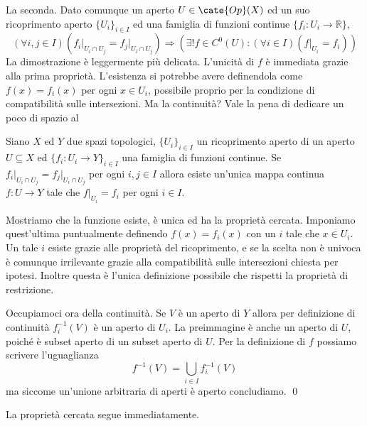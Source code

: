 La seconda.
Dato comunque un aperto $U\in\cate{Op}(X)$ ed un suo ricoprimento aperto $\{U_i\}_{i\in I}$ ed una famiglia di funzioni continue $\{f_i\colon U_i\to \mathbb R\}$,
\[
(\forall i,j\in I) \left(f_i\vert_{U_i\cap U_j}=f_j\vert_{U_i\cap U_j}\right) \Rightarrow (\exists! f\in C^0(U)\colon (\forall i\in I)(f\vert_{U_i}=f_i))
\]
La dimostrazione è leggermente più delicata.
L'unicità di $f$ è immediata grazie alla prima proprietà.
L'esistenza si potrebbe avere definendola come $f(x)=f_i(x)$ per ogni $x\in U_i$, possibile proprio per la condizione di compatibilità sulle intersezioni.
Ma la continuità?
Vale la pena di dedicare un poco di spazio al

{\lem[Pasting] Siano $X$ ed $Y$ due spazi topologici, $\{U_i\}_{i\in I}$ un ricoprimento aperto di un aperto $U\subseteq X$ ed $\{f_i\colon U_i\to Y\}_{i\in I}$ una famiglia di funzioni continue.
Se $f_i\vert_{U_i\cap U_j}=f_j\vert_{U_i\cap U_j}$ per ogni $i,j\in I$ allora esiste un'unica mappa continua $f\colon U\to Y$ tale che $f\vert_{U_i}=f_i$ per ogni $i\in I$.}
{\proof Mostriamo che la funzione esiste, è unica ed ha la proprietà cercata.
Imponiamo quest'ultima puntualmente definendo $f(x)=f_i(x)$ con un $i$ tale che $x\in U_i$.
Un tale $i$ esiste grazie alle proprietà del ricoprimento, e se la scelta non è univoca è comunque irrilevante grazie alla compatibilità sulle intersezioni chiesta per ipotesi.
Inoltre questa è l'unica definizione possibile che rispetti la proprietà di restrizione.

Occupiamoci ora della continuità.
Se $V$ è un aperto di $Y$ allora per definizione di continuità $f^{-1}_i(V)$ è un aperto di $U_i$.
La preimmagine è anche un aperto di $U$, poiché è subset aperto di un subset aperto di $U$.
Per la definizione di $f$ possiamo scrivere l'uguaglianza
\[
f^{-1}(V)=\bigcup_{i\in I}f^{-1}_i(V)
\]
ma siccome un'unione arbitraria di aperti è aperto concludiamo. \qed}

La proprietà cercata segue immediatamente.



